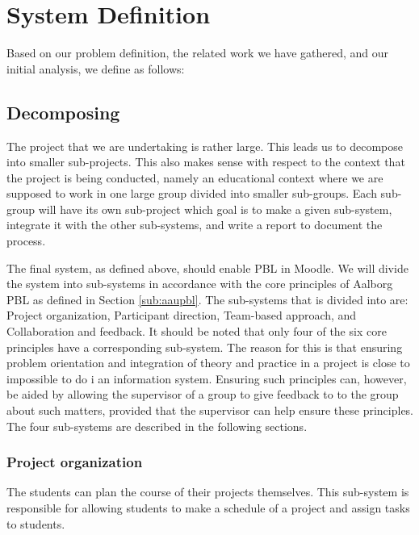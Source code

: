 \section{System Definition}
\label{sec:systemDef}
Based on our problem definition, the related work we have gathered, and our initial analysis, we define \system as follows:












\subsection{Decomposing \system}
\label{sub:decomposingSys}
The project that we are undertaking is rather large.
This leads us to decompose into smaller sub-projects.
This also makes sense with respect to the context that the project is being conducted, namely an educational context where we are supposed to work in one large group divided into smaller sub-groups.
Each sub-group will have its own sub-project which goal is to make a given sub-system, integrate it with the other sub-systems, and write a report to document the process.

The final system, as defined above, should enable PBL in Moodle.
We will divide the system into sub-systems in accordance with the core principles of Aalborg PBL as defined in Section \ref{sub:aaupbl}.
The sub-systems that \system is divided into are:
Project organization,
Participant direction,
Team-based approach, and
Collaboration and feedback.
It should be noted that only four of the six core principles have a corresponding sub-system.
The reason for this is that ensuring problem orientation and integration of theory and practice in a project is close to impossible to do i an information system.
Ensuring such principles can, however, be aided by allowing the supervisor of a group to give feedback to to the group about such matters, provided that the supervisor can help ensure these principles.
The four sub-systems are described in the following sections.

\subsubsection{Project organization}
The students can plan the course of their projects themselves.
This sub-system is responsible for allowing students to make a schedule of a project and assign tasks to students.

